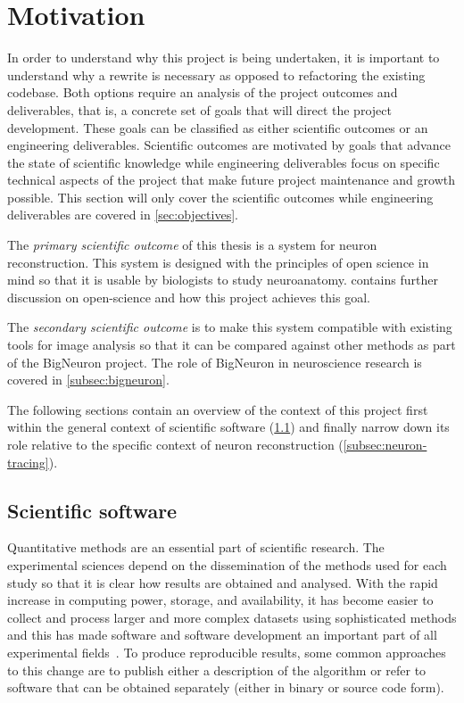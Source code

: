 \section{Motivation}\label{sec:motivation}

In order to understand why this project is being undertaken, it is
important to understand why a rewrite is necessary as opposed to refactoring
the existing codebase. Both options require an analysis of the project
outcomes and deliverables, that is, a concrete set of goals that will direct the project
development. These goals can be classified as either scientific
outcomes or an engineering deliverables. Scientific outcomes are motivated by goals that
advance the state of scientific knowledge while engineering deliverables focus
on specific technical aspects of the project that make future project
maintenance and growth possible. This section will only cover the scientific
outcomes while engineering deliverables are covered in \cref{sec:objectives}.

The \emph{primary scientific outcome} of this thesis is a system for
neuron reconstruction. This system is designed with the principles of open
science in mind so that it is usable by biologists to study
neuroanatomy.  contains further
discussion on open-science and how this project achieves this
goal.

The \emph{secondary scientific outcome} is to make this system
compatible with existing tools for image analysis so that it can
be compared against other methods as part of the BigNeuron
project. The role of BigNeuron in neuroscience research is covered
in \cref{subsec:bigneuron}.

The following sections contain an overview of the context of this project
first within the general context of scientific software (\cref{subsec:sci-soft})
and finally narrow down its role relative to the specific context
of neuron reconstruction (\cref{subsec:neuron-tracing}).

\subsection{Scientific software}\label{subsec:sci-soft}
{ %
	Quantitative methods are an essential part of scientific research. The
	experimental sciences depend on the dissemination of the methods used for each
	study so that it is clear how results are obtained and analysed.
	With the rapid increase in computing power, storage, and availability,
	it has become easier to collect and process larger and more complex datasets
	using sophisticated methods and this has made software and
	software development an important part of all experimental
	fields~\autocite{Baxter2006,SSI:hettrick_2014_14809}.
	To produce reproducible results, some common approaches to this change are
	to publish either a description of the algorithm or refer to software
	that can be obtained separately (either in binary or source code form).
}


